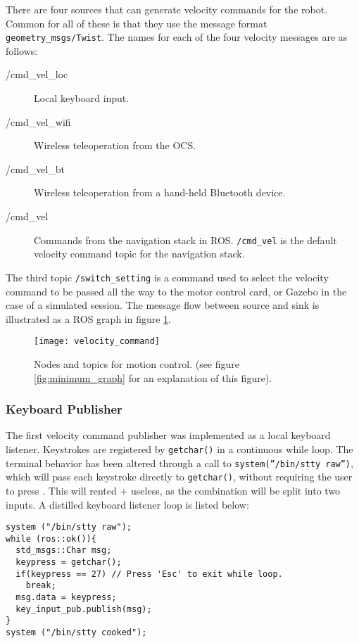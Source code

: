 There are four sources that can generate velocity commands for the robot. Common for all of these is that they use the message format \texttt{geometry\_msgs/Twist}. The names for each of the four velocity messages are as follows:

\begin{description}
	\item[/cmd\_vel\_loc] Local keyboard input.
	\item[/cmd\_vel\_wifi] Wireless teleoperation from the \ac{OCS}.
	\item[/cmd\_vel\_bt] Wireless teleoperation from a hand-held Bluetooth device.
	\item[/cmd\_vel] Commands from the navigation stack in \ac{ROS}. \texttt{/cmd\_vel} is the default \: \: velocity command topic for the navigation stack.
\end{description}

The third topic \texttt{/switch\_setting} is a command used to select the velocity command to be passed all the way to the motor control card, or Gazebo in the case of a simulated session. The message flow between source and sink is illustrated as a \ac{ROS} graph in figure \ref{fig:move_base_nodes}.

\begin{figure}[h]
	\centering
	\texttt{[image: velocity\_command]}
	\caption{Nodes and topics for motion control. (see figure \ref{fig:minimum_graph} for an explanation of this figure).}
	\label{fig:move_base_nodes}
\end{figure}

\subsubsection{Keyboard Publisher}

The first velocity command publisher was implemented as a local keyboard listener. Keystrokes are  registered by \texttt{getchar()} in a continuous while loop. The terminal behavior has been altered through a call to \texttt{system(''/bin/stty raw'')}, which will pass each keystroke directly to \texttt{getchar()}, without requiring the user to press . This will rented $+$ useless, as the combination will be split into two inputs. A distilled keyboard listener loop is listed below:

\begin{lstlisting}
system ("/bin/stty raw"); 
while (ros::ok()){
  std_msgs::Char msg;
  keypress = getchar();
  if(keypress == 27) // Press 'Esc' to exit while loop.
    break;
  msg.data = keypress;
  key_input_pub.publish(msg);
}
system ("/bin/stty cooked");
\end{lstlisting}

